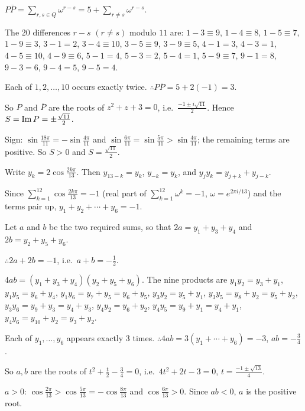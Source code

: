   $P\overline{P} = \displaystyle\sum_{r, s\in Q}\omega^{r - s} = 5 + \sum_{r\neq s}\omega^{r - s}$.

  The $20$ differences $r - s$ $(r\neq s)$ modulo $11$ are: $1 - 3\equiv 9$, $1 - 4\equiv 8$, $1 - 5\equiv 7$, $1 -
  9\equiv 3$, $3 - 1 = 2$, $3 - 4\equiv 10$, $3 - 5\equiv 9$, $3 - 9\equiv 5$, $4 - 1 = 3$, $4 - 3 = 1$, $4 - 5\equiv
  10$, $4 - 9\equiv 6$, $5 - 1 = 4$, $5 - 3 = 2$, $5 - 4 = 1$, $5 - 9\equiv 7$, $9 - 1 = 8$, $9 - 3 = 6$, $9 - 4 =
  5$, $9 - 5 = 4$.

  Each of $1, 2, \ldots, 10$ occurs exactly twice. $\therefore P\overline{P} = 5 + 2(-1) = 3$.

  So $P$ and $\overline{P}$ are the roots of $z^2 + z + 3 = 0$, i.e.\ $\frac{-1\pm i\sqrt{11}}{2}$. Hence $S = {\rm
    Im}\,P = \pm\frac{\sqrt{11}}{2}$.

  Sign: $\sin\frac{18\pi}{11} = -\sin\frac{4\pi}{11}$ and $\sin\frac{6\pi}{11} = \sin\frac{5\pi}{11} >
  \sin\frac{4\pi}{11}$; the remaining terms are positive. So $S > 0$ and $S = \frac{\sqrt{11}}{2}$.
\item Write $y_k = 2\cos\frac{2k\pi}{13}$. Then $y_{13 - k} = y_k$, $y_{-k} = y_k$, and $y_jy_k = y_{j + k} + y_{j -
    k}$.

  Since $\displaystyle\sum_{k = 1}^{12}\cos\frac{2k\pi}{13} = -1$ (real part of $\sum_{k = 1}^{12}\omega^k = -1$,
  $\omega = e^{2\pi i/13}$) and the terms pair up, $y_1 + y_2 + \cdots + y_6 = -1$.

  Let $a$ and $b$ be the two required sums, so that $2a = y_1 + y_3 + y_4$ and $2b = y_2 + y_5 + y_6$.

  $\therefore 2a + 2b = -1$, i.e.\ $a + b = -\frac{1}{2}$.

  $4ab = (y_1 + y_3 + y_4)(y_2 + y_5 + y_6)$. The nine products are $y_1y_2 = y_3 + y_1$, $y_1y_5 = y_6 + y_4$,
  $y_1y_6 = y_7 + y_5 = y_6 + y_5$, $y_3y_2 = y_5 + y_1$, $y_3y_5 = y_8 + y_2 = y_5 + y_2$, $y_3y_6 = y_9 + y_3 = y_4 +
  y_3$, $y_4y_2 = y_6 + y_2$, $y_4y_5 = y_9 + y_1 = y_4 + y_1$, $y_4y_6 = y_{10} + y_2 = y_3 + y_2$.

  Each of $y_1, \ldots, y_6$ appears exactly $3$ times. $\therefore 4ab = 3(y_1 + \cdots + y_6) = -3$, $ab =
  -\frac{3}{4}$.

  So $a, b$ are the roots of $t^2 + \frac{t}{2} - \frac{3}{4} = 0$, i.e.\ $4t^2 + 2t - 3 = 0$, $t = \frac{-1\pm
    \sqrt{13}}{4}$.

  $a > 0$: $\cos\frac{2\pi}{13} > \cos\frac{5\pi}{13} = -\cos\frac{8\pi}{13}$ and $\cos\frac{6\pi}{13} > 0$. Since
  $ab < 0$, $a$ is the positive root.


